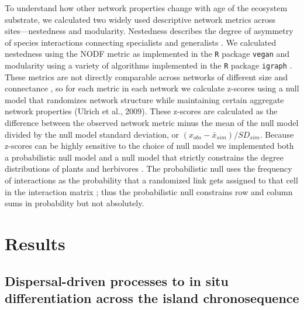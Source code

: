To understand how other network properties change with age of the
ecosystem substrate, we calculated two widely used descriptive network
metrics across sites–--nestedness and modularity. Nestedness describes
the degree of asymmetry of species interactions connecting specialists
and generalists \citep{bascompte2007, ulrich2009}. We calculated
nestedness using the NODF metric \citep{nodf} as implemented in the
\texttt{R} package \texttt{vegan} \citep{vegan} and modularity using a
variety of algorithms implemented in the \texttt{R} package
\texttt{igraph} \citep{igraph}. These metrics are not directly
comparable across networks of different size and connectance
\citep{ulrich2009}, so for each metric in each network we calculate
z-scores using a null model that randomizes network structure while
maintaining certain aggregate network properties (Ulrich et al.,
2009). These z-scores are calculated as the difference between the
observed network metric minus the mean of the null model divided by
the null model standard deviation, or $(x_{obs} − \bar{x}_{sim}) /
SD_{sim}$. Because z-scores can be highly sensitive to the choice of
null model \citep{ulrich2009} we implemented both a probabilistic null
model \citep{bascompte2007} and a null model that strictly constrains
the degree distributions of plants and herbivores
\citep{ulrich2009}. The probabilistic null uses the frequency of
interactions as the probability that a randomized link gets assigned
to that cell in the interaction matrix \citep{bascompte2007}; thus the
probabilistic null constrains row and column sums in probability but
not absolutely.


\section{Results}

\subsection{Dispersal-driven processes to in situ differentiation
across the island chronosequence}

